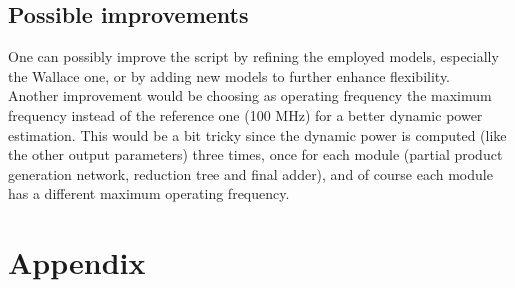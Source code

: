 \documentclass[11pt]{article} %
\begin{document}
\subsection{Possible improvements}
One can possibly improve the script by refining the employed models, especially the Wallace one, or by adding new models to further enhance flexibility.\\
Another improvement would be choosing as operating frequency the maximum frequency instead of the reference one (100 MHz) for a better dynamic power estimation. This would be a bit tricky since the dynamic power is computed (like the other output parameters) three times, once for each module (partial product generation network, reduction tree and final adder), and of course each module has a different maximum operating frequency.
\newpage
\appendix
\section{Appendix}
\footnotesize

\end{document}
